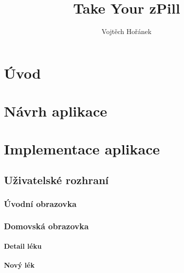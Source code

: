 \documentclass[a4paper,12pt]{report}
\title{Take Your zPill}
\author{Vojtěch Hořánek}
\begin{document}






\renewcommand\cftsecafterpnum{\vskip10pt}
\renewcommand\cftsubsecafterpnum{\vskip10pt}
\renewcommand\cftsubsubsecafterpnum{\vskip10pt}
\newpage
\tableofcontents %

\chapter*{Úvod}



\chapter{Návrh aplikace}


\chapter{Implementace aplikace}


\section{Uživatelské rozhraní}


\subsection{Úvodní obrazovka}


\subsection{Domovská obrazovka}


\subsubsection{Detail léku}


\subsubsection{Nový lék}

\end{document}
